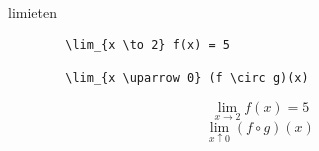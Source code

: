 \begin{frame}[fragile]{limieten}
    \begin{verbatim}
        \lim_{x \to 2} f(x) = 5

        \lim_{x \uparrow 0} (f \circ g)(x)
    \end{verbatim}

    \begin{tcolorbox}[width=11cm, size=small]
        \[
        \lim_{x \to 2} f(x) = 5
        \]
        \newline
        \[\lim_{x \uparrow 0} (f \circ g)(x)
        \]
    \end{tcolorbox}
\end{frame}